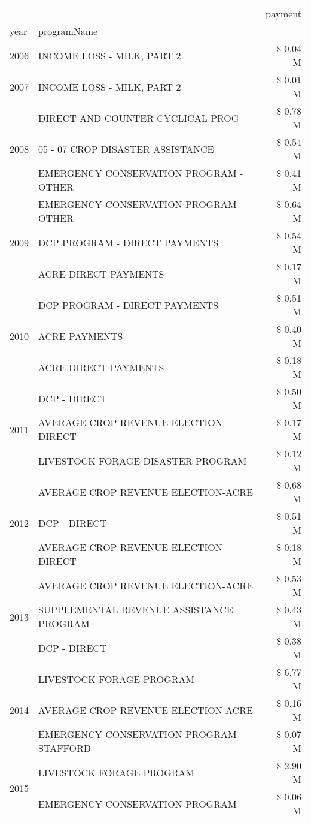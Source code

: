 \begin{tabular}{llr}
\toprule
 &  & payment \\
year & programName &  \\
\midrule
2006 & INCOME LOSS - MILK, PART 2 & \$ 0.04 M \\
\cline{1-3}
2007 & INCOME LOSS - MILK, PART 2 & \$ 0.01 M \\
\cline{1-3}
\multirow[t]{3}{*}{2008} & DIRECT AND COUNTER CYCLICAL PROG & \$ 0.78 M \\
 & 05 - 07 CROP DISASTER ASSISTANCE & \$ 0.54 M \\
 & EMERGENCY CONSERVATION PROGRAM - OTHER & \$ 0.41 M \\
\cline{1-3}
\multirow[t]{3}{*}{2009} & EMERGENCY CONSERVATION PROGRAM - OTHER & \$ 0.64 M \\
 & DCP PROGRAM - DIRECT PAYMENTS & \$ 0.54 M \\
 & ACRE DIRECT PAYMENTS & \$ 0.17 M \\
\cline{1-3}
\multirow[t]{3}{*}{2010} & DCP PROGRAM - DIRECT PAYMENTS & \$ 0.51 M \\
 & ACRE PAYMENTS & \$ 0.40 M \\
 & ACRE DIRECT PAYMENTS & \$ 0.18 M \\
\cline{1-3}
\multirow[t]{3}{*}{2011} & DCP - DIRECT & \$ 0.50 M \\
 & AVERAGE CROP REVENUE ELECTION-DIRECT & \$ 0.17 M \\
 & LIVESTOCK FORAGE DISASTER PROGRAM & \$ 0.12 M \\
\cline{1-3}
\multirow[t]{3}{*}{2012} & AVERAGE CROP REVENUE ELECTION-ACRE & \$ 0.68 M \\
 & DCP - DIRECT & \$ 0.51 M \\
 & AVERAGE CROP REVENUE ELECTION-DIRECT & \$ 0.18 M \\
\cline{1-3}
\multirow[t]{3}{*}{2013} & AVERAGE CROP REVENUE ELECTION-ACRE & \$ 0.53 M \\
 & SUPPLEMENTAL REVENUE ASSISTANCE PROGRAM & \$ 0.43 M \\
 & DCP - DIRECT & \$ 0.38 M \\
\cline{1-3}
\multirow[t]{3}{*}{2014} & LIVESTOCK FORAGE PROGRAM & \$ 6.77 M \\
 & AVERAGE CROP REVENUE ELECTION-ACRE & \$ 0.16 M \\
 & EMERGENCY CONSERVATION PROGRAM STAFFORD & \$ 0.07 M \\
\cline{1-3}
\multirow[t]{3}{*}{2015} & LIVESTOCK FORAGE PROGRAM & \$ 2.90 M \\
 & EMERGENCY CONSERVATION PROGRAM & \$ 0.06 M \\

\end{tabular}
